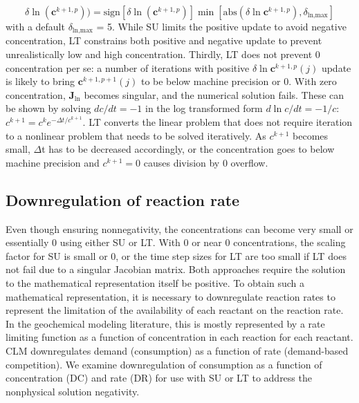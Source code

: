 \documentclass[gmd, manuscript]{copernicus}
\begin{document}
\begin{equation}
\delta \ln(\mathbf{c}^{k+1,p}))=\text{sign}[\delta
\ln(\mathbf{c}^{k+1,p})]\min[\text{abs}(\delta \ln
\mathbf{c}^{k+1,p}),\delta_\text{ln,max}]
\label{eq:lnlimit}
\end{equation}
with a default $\delta_\text{ln,max}$ = 5. While SU limits the positive update
to avoid negative concentration, LT constrains both positive and negative
update to prevent unrealistically low and high concentration. Thirdly, LT does
not prevent 0
concentration per se: a number of iterations with positive $\delta \ln
\mathbf{c}^{k+1,p} (j)$ update is likely to bring $\mathbf{c}^{k+1,p+1} (j)$ to
be below machine precision or 0. With zero concentration,
$\mathbf{J}_\text{ln}$ becomes singular, and the numerical solution fails.
These can be shown by solving $dc/dt=-1$ in the log transformed form $d\ln
c/dt=-1/c$: $c^{k+1}=c^k e^{-\Delta t/c^{k+1}}$. LT
converts the linear problem that does not require iteration to a nonlinear
problem that needs to be solved iteratively.
As $c^{k+1}$ becomes small, $\Delta$t has to be decreased accordingly, or the
concentration goes to below machine precision and $c^{k+1}=0$ causes division
by 0 overflow. 

\subsection{Downregulation of reaction rate}
Even though ensuring nonnegativity, the concentrations can become very small or
essentially 0 using either SU or LT. With 0 or near 0 concentrations, the
scaling factor for SU is small or 0, or the time step sizes for LT are too
small if LT does not fail due to a singular Jacobian matrix. Both approaches
require the solution to the mathematical representation itself be
positive. To obtain such a mathematical representation, it is necessary to
downregulate reaction rates to represent the limitation of the availability of
each reactant on the reaction rate.  In the geochemical modeling literature,
this is mostly represented by a rate limiting function as a function of
concentration in each reaction for each reactant. CLM downregulates demand
(consumption) as a function of rate (demand-based competition). We examine
downregulation of consumption as a function of concentration (DC) and rate (DR)
for use with SU or LT to address the nonphysical solution negativity.
\end{document}
